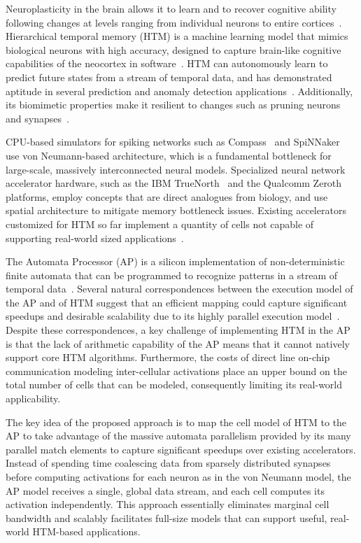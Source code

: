 Neuroplasticity in the brain allows it to learn and to recover cognitive ability following changes at levels ranging from individual neurons to entire cortices~\cite{wikipedia2018neuroplasticity}.
Hierarchical temporal memory (HTM) is a machine learning model that mimics biological neurons with high accuracy, designed to capture brain-like cognitive capabilities of the neocortex in software~\cite{hawkins2006hierarchical, hawkins2010hierarchical}.
HTM can autonomously learn to predict future states from a stream of temporal data, and has demonstrated aptitude in several prediction and anomaly detection applications~\cite{doremalen2008spoken, lavin2015evaluating, ahmad2016real, bonhoff2008using}.
Additionally, its biomimetic properties make it resilient to changes such as pruning neurons and synapses~\cite{mnatzaganian2017mathematical, ahmad2015properties}.

CPU-based simulators for spiking networks such as Compass~\cite{preissl2012compass} and SpiNNaker~\cite{painkras2013spinnaker} use von Neumann-based architecture, which is a fundamental bottleneck for large-scale, massively interconnected neural models.
Specialized neural network accelerator hardware, such as the IBM TrueNorth~\cite{merolla2014million} and the Qualcomm Zeroth~\cite{kumar2013introducing} platforms, employ concepts that are direct analogues from biology, and use spatial architecture to mitigate memory bottleneck issues.
Existing accelerators customized for HTM so far implement a quantity of cells not capable of supporting real-world sized applications~\cite{fan2016hierarchical}.

The Automata Processor (AP) is a silicon implementation of non-deterministic finite automata that can be programmed to recognize patterns in a stream of temporal data~\cite{dlugosch2014efficient}. 
Several natural correspondences between the execution model of the AP and of HTM suggest that an efficient mapping could capture significant speedups and desirable scalability due to its highly parallel execution model~\cite{putic2017hierarchical}.
Despite these correspondences, a key challenge of implementing HTM in the AP is that the lack of arithmetic capability of the AP means that it cannot natively support core HTM algorithms.
Furthermore, the costs of direct line on-chip communication modeling inter-cellular activations place an upper bound on the total number of cells that can be modeled, consequently limiting its real-world applicability.

The key idea of the proposed approach is to map the cell model of HTM to the AP to take advantage of the massive automata parallelism provided by its many parallel match elements to capture significant speedups over existing accelerators.
Instead of spending time coalescing data from sparsely distributed synapses before computing activations for each neuron as in the von Neumann model, the AP model receives a single, global data stream, and each cell computes its activation independently.
This approach essentially eliminates marginal cell bandwidth and scalably facilitates full-size models that can support useful, real-world HTM-based applications.

